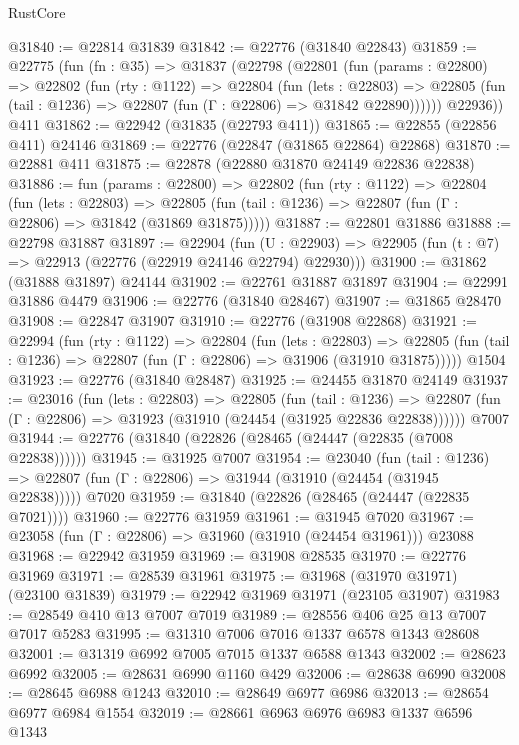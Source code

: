 \begin{lexlean}{RustCore}
\begin{coremodule}
@31840 := @22814 @31839
@31842 := @22776 (@31840 @22843)
@31859 := @22775
    (fun (fn : @35) =>
    @31837
      (@22798
        (@22801
          (fun (params : @22800) =>
          @22802
            (fun (rty : @1122) =>
            @22804
              (fun (lets : @22803) =>
              @22805 (fun (tail : @1236) => @22807 (fun (Γ : @22806) => @31842 @22890))))))
        @22936))
    @411
@31862 := @22942 (@31835 (@22793 @411))
@31865 := @22855 (@22856 @411) @24146
@31869 := @22776 (@22847 (@31865 @22864) @22868)
@31870 := @22881 @411
@31875 := @22878 (@22880 @31870 @24149 @22836 @22838)
@31886 := fun (params : @22800) =>
  @22802
    (fun (rty : @1122) =>
    @22804
      (fun (lets : @22803) =>
      @22805 (fun (tail : @1236) => @22807 (fun (Γ : @22806) => @31842 (@31869 @31875)))))
@31887 := @22801 @31886
@31888 := @22798 @31887
@31897 := @22904
    (fun (U : @22903) => @22905 (fun (t : @7) => @22913 (@22776 (@22919 @24146 @22794) @22930)))
@31900 := @31862 (@31888 @31897) @24144
@31902 := @22761 @31887 @31897
@31904 := @22991 @31886 @4479
@31906 := @22776 (@31840 @28467)
@31907 := @31865 @28470
@31908 := @22847 @31907
@31910 := @22776 (@31908 @22868)
@31921 := @22994
    (fun (rty : @1122) =>
    @22804
      (fun (lets : @22803) =>
      @22805 (fun (tail : @1236) => @22807 (fun (Γ : @22806) => @31906 (@31910 @31875)))))
    @1504
@31923 := @22776 (@31840 @28487)
@31925 := @24455 @31870 @24149
@31937 := @23016
    (fun (lets : @22803) =>
    @22805
      (fun (tail : @1236) =>
      @22807 (fun (Γ : @22806) => @31923 (@31910 (@24454 (@31925 @22836 @22838))))))
    @7007
@31944 := @22776 (@31840 (@22826 (@28465 (@24447 (@22835 (@7008 @22838))))))
@31945 := @31925 @7007
@31954 := @23040
    (fun (tail : @1236) => @22807 (fun (Γ : @22806) => @31944 (@31910 (@24454 (@31945 @22838)))))
    @7020
@31959 := @31840 (@22826 (@28465 (@24447 (@22835 @7021))))
@31960 := @22776 @31959
@31961 := @31945 @7020
@31967 := @23058 (fun (Γ : @22806) => @31960 (@31910 (@24454 @31961))) @23088
@31968 := @22942 @31959
@31969 := @31908 @28535
@31970 := @22776 @31969
@31971 := @28539 @31961
@31975 := @31968 (@31970 @31971) (@23100 @31839)
@31979 := @22942 @31969 @31971 (@23105 @31907)
@31983 := @28549 @410 @13 @7007 @7019
@31989 := @28556 @406 @25 @13 @7007 @7017 @5283
@31995 := @31310 @7006 @7016 @1337 @6578 @1343 @28608
@32001 := @31319 @6992 @7005 @7015 @1337 @6588 @1343
@32002 := @28623 @6992
@32005 := @28631 @6990 @1160 @429
@32006 := @28638 @6990
@32008 := @28645 @6988 @1243
@32010 := @28649 @6977 @6986
@32013 := @28654 @6977 @6984 @1554
@32019 := @28661 @6963 @6976 @6983 @1337 @6596 @1343

\end{coremodule}
\end{lexlean}
